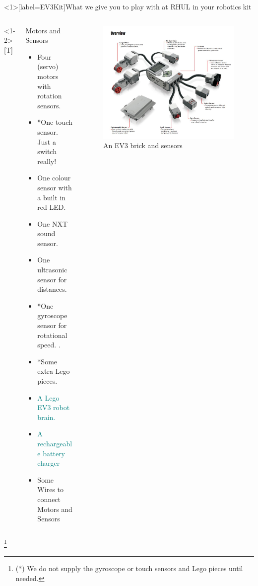 \documentclass[color=pdftex,usenames,dvipsnames, aspectratio=169]{beamer}
\begin{document}
\begin{frame}<1>[label=EV3Kit]{What we give you to play with at RHUL in your robotics kit}
\vspace*{-3mm}
\begin{columns}<1-2>[T]
\begin{column}{0.6\textwidth}
\begin{block}{Motors and Sensors}
\begin{itemize}
\item \alert{Four (servo) motors} with rotation sensors.
\item \alert{*One touch sensor.} Just a switch really!
\item \alert{One colour sensor}  with a built in red LED.
\item \alert{One NXT sound sensor.}
\item \alert{One ultrasonic sensor} for distances.
\item \alert{*One gyroscope sensor} for rotational speed.
.
\item \textcolor{OliveGreen}{*Some extra Lego pieces.}
\item \textcolor{teal}{A Lego EV3 robot brain.}
\item \textcolor{teal}{A rechargeable battery charger}
\item \textcolor{RedOrange}{Some Wires  to connect Motors and Sensors}
\end{itemize}
\end{block}
\end{column}
\begin{column}{0.4\textwidth}
\begin{figure}
\includegraphics[scale=0.18]{Images/sensors.jpg}
\caption{An EV3 brick and sensors}
\end{figure}
\end{column}
\end{columns}
\vspace*{-3.5mm}
{\let\thefootnote\relax\footnote{({\color{RedOrange}*}) We do not supply the gyroscope or touch sensors and Lego pieces until needed.}}
\end{frame}
\end{document}

